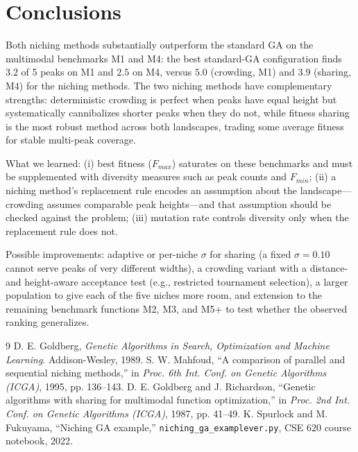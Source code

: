 \documentclass[conference]{IEEEtran}
\begin{document}
\section{Conclusions}
\label{sec:conclusions}

Both niching methods substantially outperform the standard GA on the
multimodal benchmarks M1 and M4: the best standard-GA configuration finds
$3.2$ of 5 peaks on M1 and $2.5$ on M4, versus $5.0$ (crowding, M1) and
$3.9$ (sharing, M4) for the niching methods. The two niching methods have
complementary strengths: deterministic crowding is perfect when peaks have
equal height but systematically cannibalizes shorter peaks when they do not,
while fitness sharing is the most robust method across both landscapes,
trading some average fitness for stable multi-peak coverage.

What we learned: (i) best fitness ($F_{max}$) saturates on these benchmarks
and must be supplemented with diversity measures such as peak counts and
$F_{min}$; (ii) a niching method's replacement rule encodes an assumption
about the landscape---crowding assumes comparable peak heights---and that
assumption should be checked against the problem; (iii) mutation rate
controls diversity only when the replacement rule does not.

Possible improvements: adaptive or per-niche $\sigma$ for sharing (a fixed
$\sigma=0.10$ cannot serve peaks of very different widths), a crowding
variant with a distance- and height-aware acceptance test (e.g., restricted
tournament selection), a larger population to give each of the five niches
more room, and extension to the remaining benchmark functions M2, M3, and M5+
to test whether the observed ranking generalizes.

\begin{thebibliography}{9}
 D. E. Goldberg, \emph{Genetic Algorithms in Search,
Optimization and Machine Learning}. Addison-Wesley, 1989.
 S. W. Mahfoud, ``A comparison of parallel and sequential
niching methods,'' in \emph{Proc. 6th Int. Conf. on Genetic Algorithms
(ICGA)}, 1995, pp. 136--143.
 D. E. Goldberg and J. Richardson, ``Genetic algorithms with
sharing for multimodal function optimization,'' in \emph{Proc. 2nd Int.
Conf. on Genetic Algorithms (ICGA)}, 1987, pp. 41--49.
 K. Spurlock and M. Fukuyama, ``Niching GA example,''
\texttt{niching\_ga\_examplever.py}, CSE 620 course notebook, 2022.
\end{thebibliography}

\appendices
\end{document}
